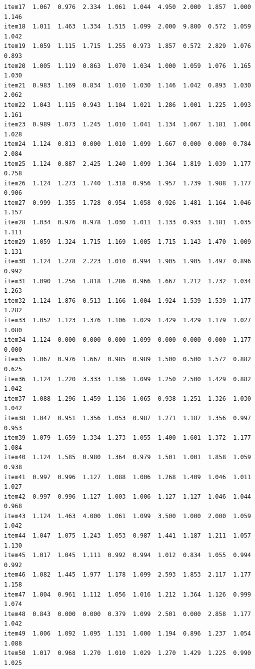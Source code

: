\documentclass[
  a4paper,
]{ltjsbook}
\begin{document}
\begin{verbatim}
item17  1.067  0.976  2.334  1.061  1.044  4.950  2.000  1.857  1.000  1.146
item18  1.011  1.463  1.334  1.515  1.099  2.000  9.800  0.572  1.059  1.042
item19  1.059  1.115  1.715  1.255  0.973  1.857  0.572  2.829  1.076  0.893
item20  1.005  1.119  0.863  1.070  1.034  1.000  1.059  1.076  1.165  1.030
item21  0.983  1.169  0.834  1.010  1.030  1.146  1.042  0.893  1.030  2.062
item22  1.043  1.115  0.943  1.104  1.021  1.286  1.001  1.225  1.093  1.161
item23  0.989  1.073  1.245  1.010  1.041  1.134  1.067  1.181  1.004  1.028
item24  1.124  0.813  0.000  1.010  1.099  1.667  0.000  0.000  0.784  2.084
item25  1.124  0.887  2.425  1.240  1.099  1.364  1.819  1.039  1.177  0.758
item26  1.124  1.273  1.740  1.318  0.956  1.957  1.739  1.988  1.177  0.906
item27  0.999  1.355  1.728  0.954  1.058  0.926  1.481  1.164  1.046  1.157
item28  1.034  0.976  0.978  1.030  1.011  1.133  0.933  1.181  1.035  1.111
item29  1.059  1.324  1.715  1.169  1.005  1.715  1.143  1.470  1.009  1.131
item30  1.124  1.278  2.223  1.010  0.994  1.905  1.905  1.497  0.896  0.992
item31  1.090  1.256  1.818  1.286  0.966  1.667  1.212  1.732  1.034  1.263
item32  1.124  1.876  0.513  1.166  1.004  1.924  1.539  1.539  1.177  1.282
item33  1.052  1.123  1.376  1.106  1.029  1.429  1.429  1.179  1.027  1.080
item34  1.124  0.000  0.000  0.000  1.099  0.000  0.000  0.000  1.177  0.000
item35  1.067  0.976  1.667  0.985  0.989  1.500  0.500  1.572  0.882  0.625
item36  1.124  1.220  3.333  1.136  1.099  1.250  2.500  1.429  0.882  1.042
item37  1.088  1.296  1.459  1.136  1.065  0.938  1.251  1.326  1.030  1.042
item38  1.047  0.951  1.356  1.053  0.987  1.271  1.187  1.356  0.997  0.953
item39  1.079  1.659  1.334  1.273  1.055  1.400  1.601  1.372  1.177  1.084
item40  1.124  1.585  0.980  1.364  0.979  1.501  1.001  1.858  1.059  0.938
item41  0.997  0.996  1.127  1.088  1.006  1.268  1.409  1.046  1.011  1.027
item42  0.997  0.996  1.127  1.003  1.006  1.127  1.127  1.046  1.044  0.968
item43  1.124  1.463  4.000  1.061  1.099  3.500  1.000  2.000  1.059  1.042
item44  1.047  1.075  1.243  1.053  0.987  1.441  1.187  1.211  1.057  1.130
item45  1.017  1.045  1.111  0.992  0.994  1.012  0.834  1.055  0.994  0.992
item46  1.082  1.445  1.977  1.178  1.099  2.593  1.853  2.117  1.177  1.158
item47  1.004  0.961  1.112  1.056  1.016  1.212  1.364  1.126  0.999  1.074
item48  0.843  0.000  0.000  0.379  1.099  2.501  0.000  2.858  1.177  1.042
item49  1.006  1.092  1.095  1.131  1.000  1.194  0.896  1.237  1.054  1.088
item50  1.017  0.968  1.270  1.010  1.029  1.270  1.429  1.225  0.990  1.025

\end{verbatim}
\end{document}
